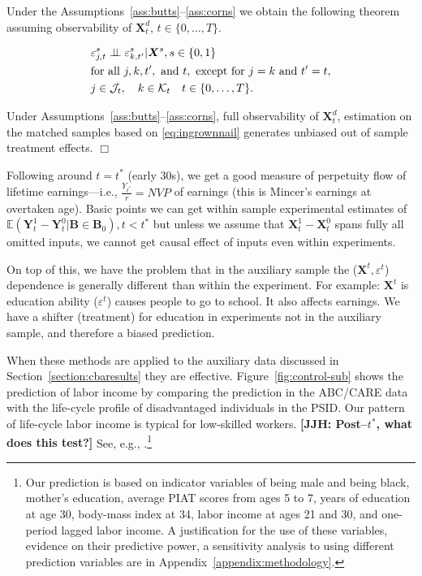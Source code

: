 Under the Assumptions~\ref{ass:butts}--\ref{ass:corns} we obtain the following theorem assuming observability of $\bm{X}^d_t$, $t \in \{0,\dots,T\}$.

\begin{assumption}\label{ass:corns}
\begin{align*}
&\varepsilon^s_{j,t} \perp\!\!\!\perp \varepsilon^s_{k,t^\prime} | \bm{X}^s, s \in \{0,1\}\\
&\text{for all } j, k, t^\prime, \text{ and } t, \text{ except for } j=k \text{ and } t^\prime = t,\\
&j \in \mathcal{J}_t, \quad k \in \mathcal{K}_t \quad t \in \{0,\dots,T\}.
\end{align*}
\end{assumption}

\begin{theorem}
Under Assumptions~\ref{ass:butts}--\ref{ass:corns}, full observability of $\bm{X}^d_t$, estimation on the matched samples based on \eqref{eq:ingrownnail} generates unbiased out of sample treatment effects. $\Box$
\end{theorem}

Following \cite{Mincer_1974_schooling} around $t=t^*$ (early 30s), we get a good measure of perpetuity flow of lifetime earnings---i.e., $\frac{Y_{t^*}}{r}=NVP$ of earnings (this is Mincer's earnings at overtaken age). Basic points we can get within sample experimental estimates of \\ $\mathbb{E}(\bm{Y}^1_t - \bm{Y}^0_t | \bm{B} \in \bm{B}_0), t < t^*$ but unless we assume that $\bm{X}^1_t-\bm{X}^0_t$ spans fully all omitted inputs, we cannot get causal effect of inputs even within experiments.

On top of this, we have the problem that in the auxiliary sample the ($\bm{X}^t,\varepsilon^t$) dependence is generally different than within the experiment. For example: $\bm{X}^t$ is education ability ($\varepsilon^t$) causes people to go to school. It also affects earnings. We have a shifter (treatment) for education in experiments not in the auxiliary sample, and therefore a biased prediction.

When these methods are applied to the auxiliary data discussed in Section~\ref{section:cbaresults} they are effective. Figure~\ref{fig:control-sub} shows the prediction of labor income by comparing the prediction in the ABC/CARE data with the life-cycle profile of disadvantaged individuals in the PSID. Our pattern of life-cycle labor income is typical for low-skilled workers. \textbf{[JJH: Post--$t^*$, what does this test?]} See, e.g., \cite{Blundell-etal_2015_J-Pub-E}.\footnote{Our prediction is based on indicator variables of being male and being black, mother's education, average PIAT scores from ages 5 to 7, years of education at age 30, body-mass index at 34, labor income at ages 21 and 30, and one-period lagged labor income. A justification for the use of these variables, evidence on their predictive power, a sensitivity analysis to using different prediction variables are in Appendix~\ref{appendix:methodology}.}

